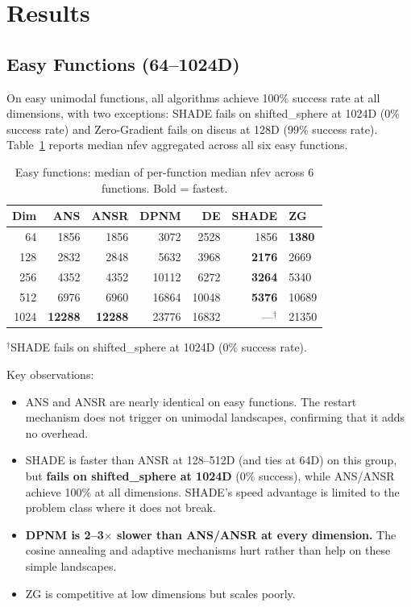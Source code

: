 \documentclass[11pt,a4paper]{article}
\begin{document}
\section{Results}
\label{sec:results}

\subsection{Easy Functions (64--1024D)}

On easy unimodal functions, all algorithms achieve 100\% success rate at all dimensions, with two exceptions: SHADE fails on shifted\_sphere at 1024D (0\% success rate) and Zero-Gradient fails on discus at 128D (99\% success rate). Table~\ref{tab:easy} reports median nfev aggregated across all six easy functions.

\begin{table}[h]
\centering
\caption{Easy functions: median of per-function median nfev across 6 functions. Bold = fastest.}
\label{tab:easy}
\begin{tabular}{@{}rrrrrrl@{}}
\toprule
Dim & ANS & ANSR & DPNM & DE & SHADE & ZG \\
\midrule
64   & 1856  & 1856  & 3072  & 2528  & 1856  & \textbf{1380} \\
128  & 2832  & 2848  & 5632  & 3968  & \textbf{2176}  & 2669 \\
256  & 4352  & 4352  & 10112 & 6272  & \textbf{3264}  & 5340 \\
512  & 6976  & 6960  & 16864 & 10048 & \textbf{5376}  & 10689 \\
1024 & \textbf{12288} & \textbf{12288} & 23776 & 16832 & ---$^\dagger$ & 21350 \\
\bottomrule
\end{tabular}

\small $^\dagger$SHADE fails on shifted\_sphere at 1024D (0\% success rate).
\end{table}

Key observations:
\begin{itemize}
    \item ANS and ANSR are nearly identical on easy functions. The restart mechanism does not trigger on unimodal landscapes, confirming that it adds no overhead.
    \item SHADE is faster than ANSR at 128--512D (and ties at 64D) on this group, but \textbf{fails on shifted\_sphere at 1024D} (0\% success), while ANS/ANSR achieve 100\% at all dimensions. SHADE's speed advantage is limited to the problem class where it does not break.
    \item \textbf{DPNM is 2--3$\times$ slower than ANS/ANSR at every dimension.} The cosine annealing and adaptive mechanisms hurt rather than help on these simple landscapes.
    \item ZG is competitive at low dimensions but scales poorly.
\end{itemize}
\end{document}
